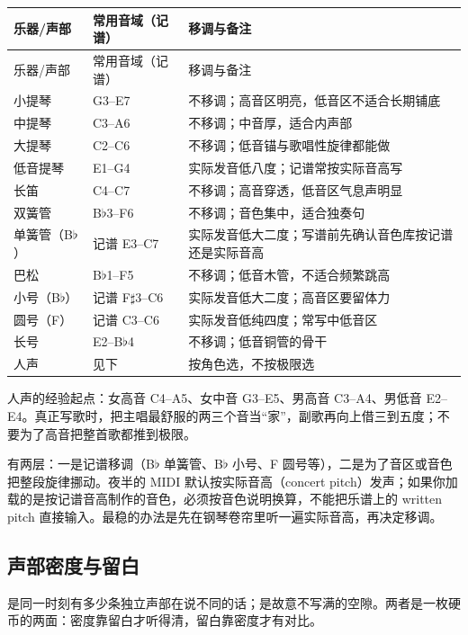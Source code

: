 \begin{longtable}{p{}p{}p{}}
\toprule
乐器/声部 & 常用音域（记谱） & 移调与备注 \\
\midrule
\endfirsthead
\toprule
乐器/声部 & 常用音域（记谱） & 移调与备注 \\
\midrule
\endhead
小提琴 & G3–E7 & 不移调；高音区明亮，低音区不适合长期铺底 \\
中提琴 & C3–A6 & 不移调；中音厚，适合内声部 \\
大提琴 & C2–C6 & 不移调；低音锚与歌唱性旋律都能做 \\
低音提琴 & E1–G4 & 实际发音低八度；记谱常按实际音高写 \\
长笛 & C4–C7 & 不移调；高音穿透，低音区气息声明显 \\
双簧管 & B$\flat$3–F6 & 不移调；音色集中，适合独奏句 \\
单簧管（B$\flat$） & 记谱 E3–C7 & 实际发音低大二度；写谱前先确认音色库按记谱还是实际音高 \\
巴松 & B$\flat$1–F5 & 不移调；低音木管，不适合频繁跳高 \\
小号（B$\flat$） & 记谱 F$\sharp$3–C6 & 实际发音低大二度；高音区要留体力 \\
圆号（F） & 记谱 C3–C6 & 实际发音低纯四度；常写中低音区 \\
长号 & E2–B$\flat$4 & 不移调；低音铜管的骨干 \\
人声 & 见下 & 按角色选，不按极限选 \\
\bottomrule
\end{longtable}

人声的经验起点：女高音 C4–A5、女中音 G3–E5、男高音 C3–A4、男低音 E2–E4。真正写歌时，把主唱最舒服的两三个音当“家”，副歌再向上借三到五度；不要为了高音把整首歌都推到极限。

有两层：一是记谱移调（B$\flat$ 单簧管、B$\flat$ 小号、F 圆号等），二是为了音区或音色把整段旋律挪动。夜半的 MIDI 默认按实际音高（concert pitch）发声；如果你加载的是按记谱音高制作的音色，必须按音色说明换算，不能把乐谱上的 written pitch 直接输入。最稳的办法是先在钢琴卷帘里听一遍实际音高，再决定移调。

\subsection{声部密度与留白}
\label{sec:density-space}

是同一时刻有多少条独立声部在说不同的话；是故意不写满的空隙。两者是一枚硬币的两面：密度靠留白才听得清，留白靠密度才有对比。

